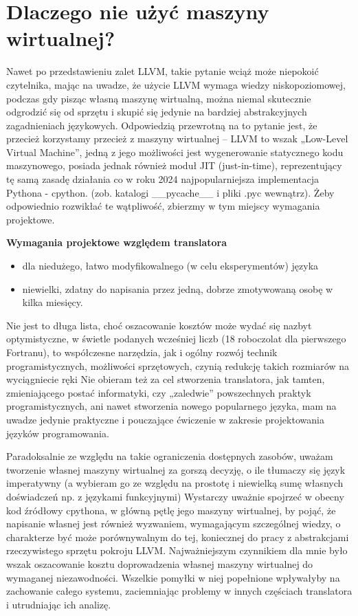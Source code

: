 \section{Dlaczego nie użyć maszyny wirtualnej?}
Nawet po przedstawieniu zalet LLVM, takie pytanie wciąż może niepokoić czytelnika, mając na uwadze, że użycie LLVM wymaga wiedzy niskopoziomowej, podczas gdy pisząc własną maszynę wirtualną, można niemal skutecznie odgrodzić się od sprzętu i skupić się jedynie na bardziej abstrakcyjnych zagadnieniach językowych. 
Odpowiedzią przewrotną na to pytanie jest, że przecież korzystamy przecież z maszyny wirtualnej – LLVM to wszak „Low-Level Virtual Machine”, jedną z jego możliwości jest wygenerowanie statycznego kodu maszynowego, posiada jednak również moduł JIT (just-in-time), reprezentujący tę samą zasadę działania co w roku 2024 najpopularniejsza implementacja Pythona - cpython. (zob. katalogi \_\_pycache\_\_ i pliki .pyc wewnątrz). Żeby odpowiednio rozwikłać te wątpliwość, zbierzmy w tym miejscy wymagania projektowe.

\textbf{Wymagania projektowe względem translatora}
\begin{itemize}[noitemsep]
    \item dla niedużego, łatwo modyfikowalnego (w celu eksperymentów) języka
    \item niewielki, zdatny do napisania przez jedną, dobrze zmotywowaną osobę w kilka miesięcy.
\end{itemize}

Nie jest to długa lista, choć oszacowanie kosztów może wydać się nazbyt optymistyczne, w świetle podanych wcześniej liczb (18 roboczolat dla pierwszego Fortranu), to współczesne narzędzia, jak i ogólny rozwój technik programistycznych, możliwości sprzętowych, czynią redukcję takich rozmiarów na wyciągniecie ręki Nie obieram też za cel stworzenia translatora, jak tamten, zmieniającego postać informatyki, czy „zaledwie” powszechnych praktyk programistycznych, ani nawet stworzenia nowego popularnego języka, mam na uwadze jedynie praktyczne i pouczające ćwiczenie w zakresie projektowania języków programowania.

Paradoksalnie ze względu na takie ograniczenia dostępnych zasobów, uważam tworzenie własnej maszyny wirtualnej za gorszą decyzję, o ile tłumaczy się język imperatywny (a wybieram go ze względu na prostotę i niewielką sumę własnych doświadczeń np. z językami funkcyjnymi) Wystarczy uważnie spojrzeć w obecny kod źródłowy cpythona, w główną pętlę jego maszyny wirtualnej\cite{cpython_main_loop}, by pojąć, że napisanie własnej jest również wyzwaniem, wymagającym szczególnej wiedzy, o charakterze być może porównywalnym do tej, koniecznej do pracy z abstrakcjami rzeczywistego sprzętu pokroju LLVM. Najważniejszym czynnikiem dla mnie było wszak oszacowanie kosztu doprowadzenia własnej maszyny wirtualnej do wymaganej niezawodności. Wszelkie pomyłki w niej popełnione wpływałyby na zachowanie całego systemu, zaciemniając problemy w innych częściach translatora i utrudniając ich analizę. 

